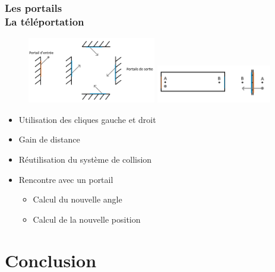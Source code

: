 \documentclass{beamer}
\begin{document}
\begin{frame}
    \frametitle{Les portails \\
                \small La téléportation}
    \begin{figure}
        \includegraphics[width=0.5\textwidth]{images/portal2.png}
		\includegraphics[width=0.45\textwidth]{images/portal3.png}
	\end{figure}
    \begin{block}{}
        \begin{itemize}
            \item Utilisation des cliques gauche et droit
            \item Gain de distance
        \end{itemize}
    \end{block}
    \begin{block}{}
        \begin{itemize}
            \item Réutilisation du système de collision
            \item Rencontre avec un portail
            \begin{itemize}
                \item Calcul du nouvelle angle
                \item Calcul de la nouvelle position
            \end{itemize}
        \end{itemize}
    \end{block}
\end{frame}

\section{Conclusion}
\end{document}
